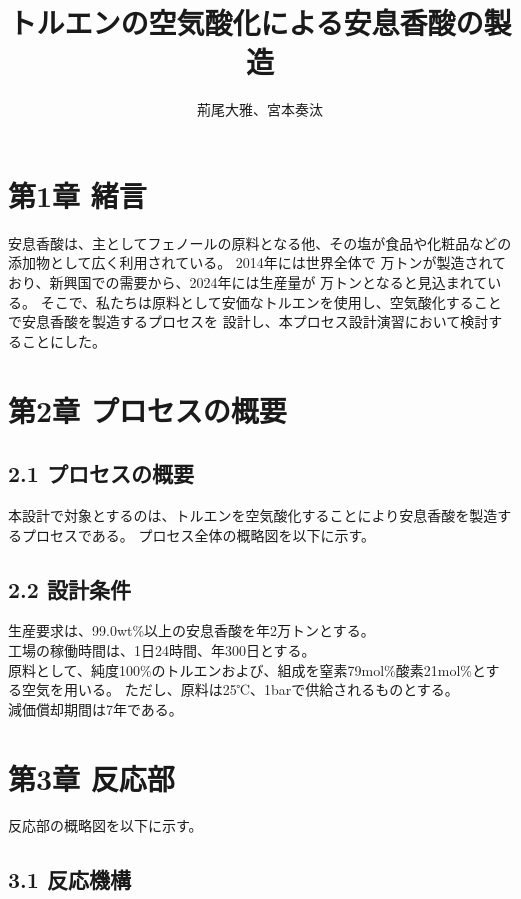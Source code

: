 \documentclass[a4j]{jsarticle}
\begin{document}
\title{トルエンの空気酸化による安息香酸の製造}
\author{荊尾大雅、宮本奏汰}
\maketitle

\newpage

\section*{第1章 緒言}
安息香酸は、主としてフェノールの原料となる他、その塩が食品や化粧品などの添加物として広く利用されている。
2014年には世界全体で 万トンが製造されており、新興国での需要から、2024年には生産量が 万トンとなると見込まれている。
そこで、私たちは原料として安価なトルエンを使用し、空気酸化することで安息香酸を製造するプロセスを
設計し、本プロセス設計演習において検討することにした。

\newpage
\section*{第2章 プロセスの概要}
\subsection*{2.1 プロセスの概要}
本設計で対象とするのは、トルエンを空気酸化することにより安息香酸を製造するプロセスである。
プロセス全体の概略図を以下に示す。

\subsection*{2.2 設計条件}
生産要求は、99.0wt\%以上の安息香酸を年2万トンとする。\\
工場の稼働時間は、1日24時間、年300日とする。\\
原料として、純度100\%のトルエンおよび、組成を窒素79mol\%酸素21mol\%とする空気を用いる。
ただし、原料は25℃、1barで供給されるものとする。\\
減価償却期間は7年である。

\newpage
\section*{第3章 反応部}
反応部の概略図を以下に示す。

\subsection*{3.1 反応機構}
\end{document}

